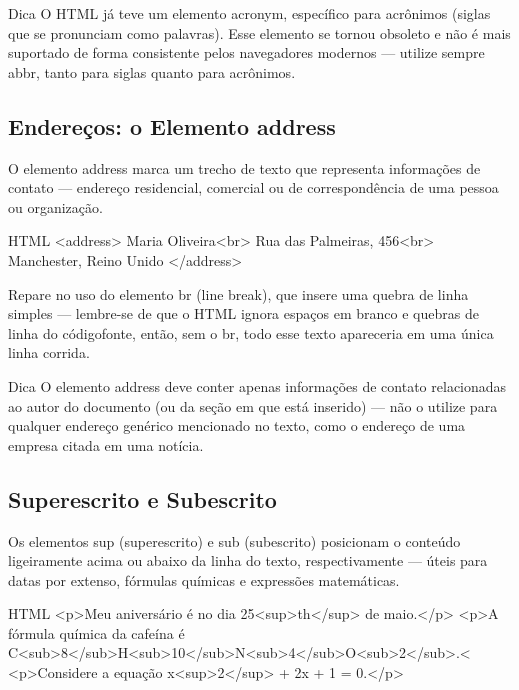 \begin{infobox}{Dica}
O HTML já teve um elemento acronym, específico para acrônimos (siglas que se pronunciam como palavras). Esse elemento se tornou obsoleto e não é mais suportado de forma consistente pelos navegadores modernos — utilize sempre abbr, tanto para siglas quanto para acrônimos.
\end{infobox}

\subsection{Endereços: o Elemento address}

O elemento address marca um trecho de texto que representa informações de contato — endereço residencial, comercial ou de correspondência de uma pessoa ou organização.

\begin{codebox}{HTML}
 <address>
   Maria Oliveira<br>
   Rua das Palmeiras, 456<br>
   Manchester, Reino Unido
 </address>
\end{codebox}

Repare no uso do elemento br (line break), que insere uma quebra de linha simples — lembre-se de que o HTML ignora espaços em branco e quebras de linha do códigofonte, então, sem o br, todo esse texto apareceria em uma única linha corrida.

\begin{infobox}{Dica}
O elemento address deve conter apenas informações de contato relacionadas ao autor do documento (ou da seção em que está inserido) — não o utilize para qualquer endereço genérico mencionado no texto, como o endereço de uma empresa citada em uma notícia.
\end{infobox}

\subsection{Superescrito e Subescrito}

Os elementos sup (superescrito) e sub (subescrito) posicionam o conteúdo ligeiramente acima ou abaixo da linha do texto, respectivamente — úteis para datas por extenso, fórmulas químicas e expressões matemáticas.

\begin{codebox}{HTML}
 <p>Meu aniversário é no dia 25<sup>th</sup> de maio.</p>
 <p>A fórmula química da cafeína é 
   C<sub>8</sub>H<sub>10</sub>N<sub>4</sub>O<sub>2</sub>.<
 <p>Considere a equação x<sup>2</sup> + 2x + 1 = 0.</p>
\end{codebox}

